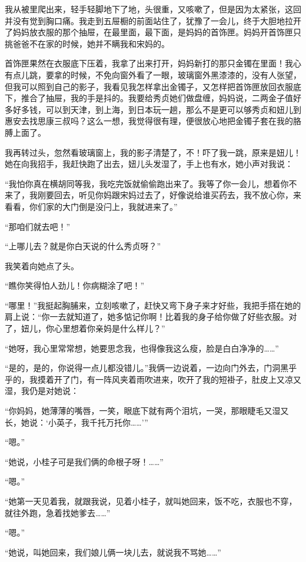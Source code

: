 \par 我从被里爬出来，轻手轻脚地下了地，头很重，又咳嗽了，但是因为太紧张，这回并没有觉到胸口痛。我走到五屉橱的前面站住了，犹豫了一会儿，终于大胆地拉开了妈妈放衣服的那个抽屉，在最里面，最下面，是妈妈的首饰匣。妈妈开首饰匣只挑爸爸不在家的时候，她并不瞒我和宋妈的。
\par 首饰匣果然在衣服底下压着，我拿了出来打开，妈妈新打的那只金镯在里面！我心有点儿跳，要拿的时候，不免向窗外看了一眼，玻璃窗外黑漆漆的，没有人张望，但我可以照到自己的影子，我看见我怎样拿出金镯子，又怎样把首饰匣放回衣服底下，推合了抽屉，我的手是抖的。我要给秀贞她们做盘缠，妈妈说，二两金子值好多好多钱，可以到天津，到上海，到日本玩一趟，那么不是更可以够秀贞和妞儿到惠安去找思康三叔吗？这么一想，我觉得很有理，便很放心地把金镯子套在我的胳膊上面了。
\par 我再转过头，忽然看玻璃窗上，我的影子清楚了，不！吓了我一跳，原来是妞儿！她在向我招手，我赶快跑了出去，妞儿头发湿了，手上也有水，她小声对我说：
\par “我怕你真在横胡同等我，我吃完饭就偷偷跑出来了。我等了你一会儿，想着你不来了，我刚要回去，听见你妈跟宋妈过去了，好像说给谁买药去，我不放心你，来看看，你们家的大门倒是没闩上，我就进来了。”
\par “那咱们就去吧！”
\par “上哪儿去？就是你白天说的什么秀贞呀？”
\par 我笑着向她点了头。
\par “瞧你笑得怕人劲儿！你病糊涂了吧！”
\par “哪里！”我挺起胸脯来，立刻咳嗽了，赶快又弯下身子来才好些，我把手搭在她的肩上说：“你一去就知道了，她多惦记你啊！比着我的身子给你做了好些衣服。对了，妞儿，你心里想着你亲妈是什么样儿？”
\par “她呀，我心里常常想，她要思念我，也得像我这么瘦，脸是白白净净的……”
\par “是的，是的，你说得一点儿都没错儿。”我俩一边说着，一边向门外去，门洞黑乎乎的，我摸着开了门，有一阵风夹着雨吹进来，吹开了我的短褂子，肚皮上又凉又湿，我仍是对她说：
\par “你妈妈，她薄薄的嘴唇，一笑，眼底下就有两个泪坑，一哭，那眼睫毛又湿又长，她说：‘小英子，我千托万托你……'”
\par “嗯。”
\par “她说，小桂子可是我们俩的命根子呀！……”
\par “嗯。”
\par “她第一天见着我，就跟我说，见着小桂子，就叫她回来，饭不吃，衣服也不穿，就往外跑，急着找她爹去……”
\par “嗯。”
\par “她说，叫她回来，我们娘儿俩一块儿去，就说我不骂她……”
